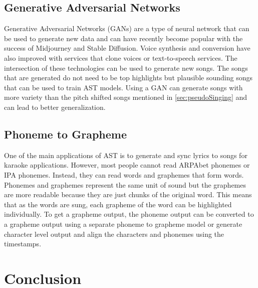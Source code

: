 \documentclass[letterpaper, 12pt]{article}
\begin{document}
\begin{multicols*}{2}
\subsection{Generative Adversarial Networks}
Generative Adversarial Networks (GANs) are a type of neural network that can be used to generate
new data and can have recently become popular with the success of Midjourney and
Stable Diffusion. Voice synthesis and conversion have also improved with services that
clone voices or text-to-speech services. The intersection of these technologies can
be used to generate new songs. The songs that are generated do not need to be top highlights
but plausible sounding songs that can be used to train AST models. Using a GAN can generate
songs with more variety than the pitch shifted songs mentioned in \ref{sec:pseudoSinging} and
can lead to better generalization.

\subsection{Phoneme to Grapheme}
One of the main applications of AST is to generate and sync lyrics to songs for karaoke
applications. However, most people cannot read ARPAbet phonemes or IPA phonemes. Instead,
they can read words and graphemes that form words. Phonemes and graphemes represent the same
unit of sound but the graphemes are more readable because they are just chunks of the original word.
This means that as the words are sung, each grapheme of the word can be highlighted individually.
To get a grapheme output, the phoneme output can be converted to a grapheme output using a
separate phoneme to grapheme model or generate character level output and align the characters and
phonemes using the timestamps.

\section{Conclusion}
\citep{pyannote}
\printbibliography

\end{multicols*}
\end{document}
